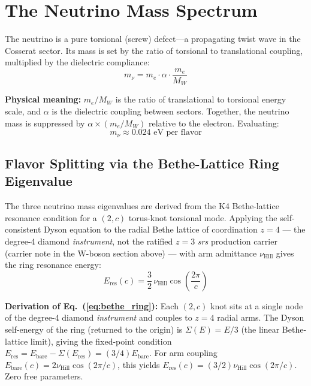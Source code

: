 \section{The Neutrino Mass Spectrum}

The neutrino is a pure torsional (screw) defect---a propagating twist wave in the Cosserat sector. Its mass is set by the ratio of torsional to translational coupling, multiplied by the dielectric compliance:
\begin{equation}
    m_\nu = m_e \cdot \alpha \cdot \frac{m_e}{M_W}
\end{equation}

\textbf{Physical meaning:} $m_e/M_W$ is the ratio of translational to torsional energy scale, and $\alpha$ is the dielectric coupling between sectors. Together, the neutrino mass is suppressed by $\alpha \times (m_e/M_W)$ relative to the electron. Evaluating:
\begin{equation}
    m_\nu \approx 0.024 \text{ eV per flavor}
\end{equation}

\subsection{Flavor Splitting via the Bethe-Lattice Ring Eigenvalue}
\label{sec:neutrino_bethe}

The three neutrino mass eigenvalues are derived from the K4 Bethe-lattice resonance
condition for a $(2,c)$ torus-knot torsional mode.  Applying the self-consistent
Dyson equation to the radial Bethe lattice of coordination $z=4$ --- the degree-4 diamond
\emph{instrument}, not the ratified $z = 3$ \emph{srs} production carrier (carrier note in the
W-boson section above) --- with arm admittance
$\nu_{\text{Hill}}$ gives the ring resonance energy:
\begin{equation}
    E_\text{res}(c) = \frac{3}{2}\,\nu_{\text{Hill}}\cos\!\left(\frac{2\pi}{c}\right)
    \label{eq:bethe_ring}
\end{equation}

\noindent\textbf{Derivation of Eq.~(\ref{eq:bethe_ring}):}
Each $(2,c)$ knot sits at a single node of the degree-4 diamond \emph{instrument} and couples to
$z=4$ radial arms.
The Dyson self-energy of the ring (returned to the origin) is
$\Sigma(E) = E/3$ (the linear Bethe-lattice limit), giving the fixed-point condition
$E_\text{res} = E_\text{bare} - \Sigma(E_\text{res}) = (3/4)E_\text{bare}$.
For arm coupling $E_\text{bare}(c) = 2\nu_{\text{Hill}}\cos(2\pi/c)$, this yields
$E_\text{res}(c) = (3/2)\nu_{\text{Hill}}\cos(2\pi/c)$.  Zero free parameters.

